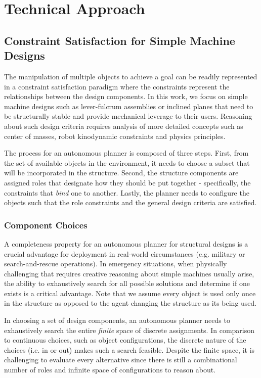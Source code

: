 \documentclass[runningheads,a4paper]{llncs}
\begin{document}
\section{Technical Approach}

\subsection{Constraint Satisfaction for Simple Machine Designs}

The manipulation of multiple objects to achieve a goal can be readily represented in a constraint
satisfaction paradigm where the constraints represent the relationships between the design
components. In this work, we focus on simple machine designs such as lever-fulcrum assemblies or
inclined planes that need to be structurally stable and provide mechanical leverage to their users.
Reasoning about such design criteria requires analysis of more detailed concepts such as center
of masses, robot kinodynamic constraints and physics principles. 

The process for an autonomous planner is composed of three steps. First, from the set of available objects
in the environment, it needs to choose a subset that will be incorporated in the structure. Second,
the structure components are assigned roles that designate how they should be put together - specifically,
the constraints that \textit{bind} one to another. Lastly, the planner needs to configure the objects
such that the role constraints and the general design criteria are satisfied. 

\subsubsection{Component Choices}

A completeness property for an autonomous planner for structural designs is a crucial advantage
for deployment in real-world circumstances (e.g. military or search-and-rescue operations). In
emergency situations, when physically challenging that requires creative reasoning about simple
machines usually arise, the ability to exhaustively search for all possible solutions and determine
if one exists is a critical advantage. Note that we assume every object is used only once in the 
structure as opposed to the agent changing the structure as its being used.

In choosing a set of design components, an autonomous planner needs to exhaustively search the 
entire \textit{finite} space of discrete assignments. In comparison to continuous choices, such as
object configurations, the discrete nature of the choices (i.e. in or out) makes such a search
feasible. Despite the finite space, it is challenging to evaluate
every alternative since there is still a combinational number of roles and infinite 
space of configurations to reason about.
\end{document}
